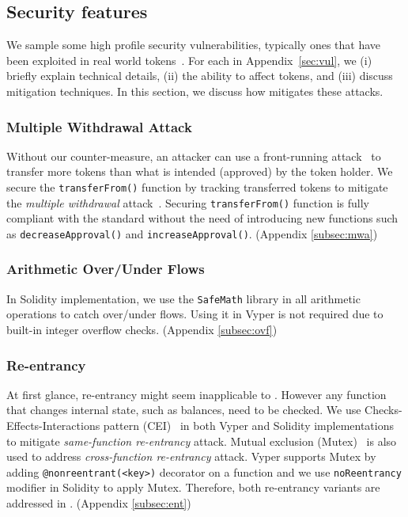 \subsection{Security features}
We sample some high profile security vulnerabilities, typically ones that have been exploited in real world \erc tokens~\cite{SolidtySecBlog,EthSecServ,SoliditySecCon,ConsensysSecCon,LandoKL}. For each in Appendix~\ref{sec:vul}, we (i) briefly explain technical details, (ii) the ability to affect \erc tokens, and (iii) discuss mitigation techniques. In this section, we discuss how \sys mitigates these attacks.

\subsubsection{Multiple Withdrawal Attack}
Without our counter-measure, an attacker can use a front-running attack~\cite{OrderingAttack,eskandari2019sok} to transfer more tokens than what is intended (approved) by the token holder. We secure the \texttt{transferFrom()} function by tracking transferred tokens to mitigate the \textit{multiple withdrawal} attack~\cite{ERC20MWA}. Securing \texttt{transferFrom()} function is fully compliant with the \erc standard without the need of introducing new functions such as \texttt{decreaseApproval()} and \texttt{increaseApproval()}. (\cf Appendix \ref{subsec:mwa})

\subsubsection{Arithmetic Over/Under Flows} 
In Solidity implementation, we use the \texttt{SafeMath} library in all arithmetic operations to catch over/under flows. Using it in Vyper is not required due to built-in integer overflow checks. (\cf Appendix \ref{subsec:ovf})

\subsubsection{Re-entrancy} 
At first glance, re-entrancy might seem inapplicable to \erc. However any function that changes internal state, such as balances, need to be checked. We use Checks-Effects-Interactions pattern (CEI)~\cite{CEI} in both Vyper and Solidity implementations to mitigate \textit{same-function re-entrancy} attack. Mutual exclusion (Mutex)~\cite{WiKiMutex} is also used to address \textit{cross-function re-entrancy} attack. Vyper supports Mutex by adding \texttt{@nonreentrant(<key>)} decorator on a function and we use \texttt{noReentrancy} modifier in Solidity to apply Mutex. Therefore, both re-entrancy variants are addressed in \sys. (\cf Appendix \ref{subsec:ent})
 
